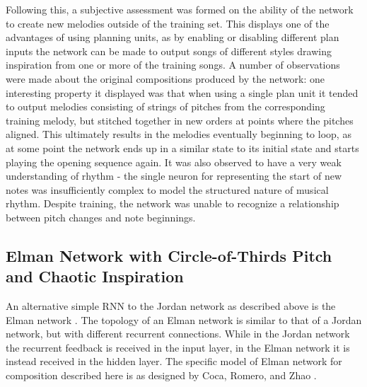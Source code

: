 \documentclass[ author={Stephen Livermore-Tozer},
				supervisor={Dr. Peter Flach},
				degree={MEng},
				title={Algorithmic Co-composition Using Machine Learning},
				subtitle={},
				type={research},
				year={2016} ]{dissertation}
\begin{document}
	Following this, a subjective assessment was formed on the ability of the network to create new melodies outside of the training set. This displays one of the advantages of using planning units, as by enabling or disabling different plan inputs the network can be made to output songs of different styles drawing inspiration from one or more of the training songs. A number of observations were made about the original compositions produced by the network: one interesting property it displayed was that when using a single plan unit it tended to output melodies consisting of strings of pitches from the corresponding training melody, but stitched together in new orders at points where the pitches aligned. This ultimately results in the melodies eventually beginning to loop, as at some point the network ends up in a similar state to its initial state and starts playing the opening sequence again. It was also observed to have a very weak understanding of rhythm - the single neuron for representing the start of new notes was insufficiently complex to model the structured nature of musical rhythm. Despite training, the network was unable to recognize a relationship between pitch changes and note beginnings.
	
	\subsection{Elman Network with Circle-of-Thirds Pitch and Chaotic Inspiration}
	\label{sec:coca-net}
	
	An alternative simple RNN to the Jordan network as described above is the Elman network \cite{elman1990finding}. The topology of an Elman network is similar to that of a Jordan network, but with different recurrent connections. While in the Jordan network the recurrent feedback is received in the input layer, in the Elman network it is instead received in the hidden layer. The specific model of Elman network for composition described here is as designed by Coca, Romero, and Zhao \cite{coca2011generation}.
	
\end{document}
